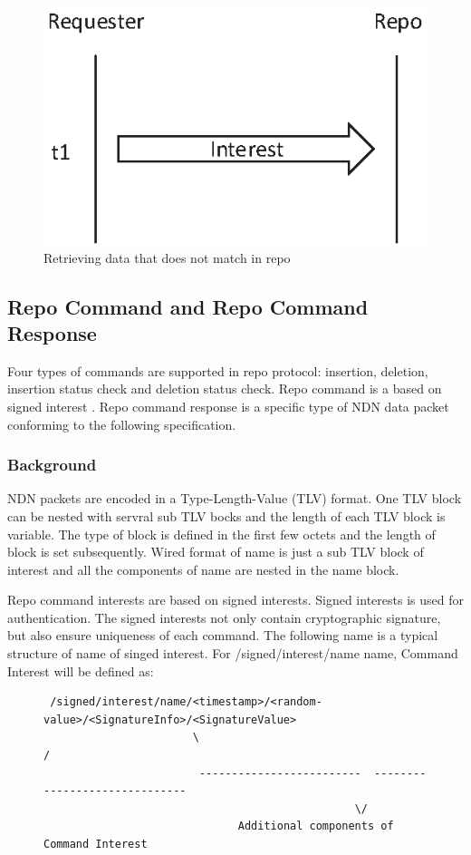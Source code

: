 \documentclass{acm_proc_article-sp}
\begin{document}
\begin{figure}
\centering
\includegraphics{Drawing2.eps}
\caption{Retrieving data that does not match in repo}
\end{figure}

\subsection{Repo Command and Repo Command Response}
Four types of commands are supported in repo protocol: insertion, deletion, insertion status check and deletion status check. Repo command is a based on signed interest \cite{signed-interest}. Repo command response is a specific type of NDN data packet conforming to the following specification.

\subsubsection{Background}
NDN packets \cite{ndn-packet} are encoded in a Type-Length-Value (TLV) format. One TLV block can be nested with servral sub TLV bocks and the length of each TLV block is variable. The type of block is defined in the first few octets and the length of block is set subsequently. Wired format of name is just a sub TLV block of interest and all the components of name are nested in the name block.

Repo command interests are based on signed interests. Signed interests is used for authentication. The signed interests not only contain cryptographic signature, but also ensure uniqueness of each command. The following name is a typical structure of name of singed interest. For /signed/interest/name name, Command Interest will be defined as:

\begin{figure}[htbp]
\centering
\begin{framed}
\begin{BVerbatim}
 /signed/interest/name/<timestamp>/<random-value>/<SignatureInfo>/<SignatureValue>
                       \                                                         /
                        -------------------------  ------------------------------
                                                \/
                              Additional components of Command Interest
\end{BVerbatim}
\end{framed}
\end{figure}
\end{document}
